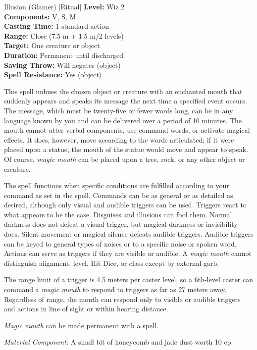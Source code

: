 {Illusion (Glamer) [Ritual]}
{
	\textbf{Level:}
	Wiz 2\\
	\textbf{Components:}
	V, S, M\\
	\textbf{Casting Time:}
	1 standard action\\
	\textbf{Range:}
	Close (7.5 m + 1.5 m/2 levels)\\
	\textbf{Target:}
	One creature or object\\
	\textbf{Duration:}
	Permanent until discharged\\
	\textbf{Saving Throw:}
	Will negates (object)\\
	\textbf{Spell Resistance:}
	Yes (object)\\
}
{
	This spell imbues the chosen object or creature with an enchanted mouth that suddenly appears and speaks its message the next time a specified event occurs. The message, which must be twenty-five or fewer words long, can be in any language known by you and can be delivered over a period of 10 minutes. The mouth cannot utter verbal components, use command words, or activate magical effects. It does, however, move according to the words articulated; if it were placed upon a statue, the mouth of the statue would move and appear to speak. Of course, \emph{magic mouth} can be placed upon a tree, rock, or any other object or creature.

	The spell functions when specific conditions are fulfilled according to your command as set in the spell. Commands can be as general or as detailed as desired, although only visual and audible triggers can be used. Triggers react to what appears to be the case. Disguises and illusions can fool them. Normal darkness does not defeat a visual trigger, but magical darkness or invisibility does. Silent movement or magical silence defeats audible triggers. Audible triggers can be keyed to general types of noises or to a specific noise or spoken word. Actions can serve as triggers if they are visible or audible. A \emph{magic mouth} cannot distinguish alignment, level, Hit Dice, or class except by external garb.

	The range limit of a trigger is 4.5 meters per caster level, so a 6th-level caster can command a \emph{magic mouth} to respond to triggers as far as 27 meters away. Regardless of range, the mouth can respond only to visible or audible triggers and actions in line of sight or within hearing distance.

	\emph{Magic mouth} can be made permanent with a  spell.

	\textit{Material Component:}
	A small bit of honeycomb and jade dust worth 10 cp.

}
